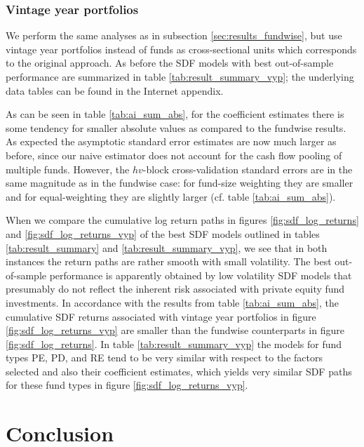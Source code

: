 \documentclass[12pt]{article}
\begin{document}
\subsubsection{Vintage year portfolios}

We perform the same analyses as in subsection \ref{sec:results_fundwise}, but use vintage year portfolios instead of funds as cross-sectional units which corresponds to the original \cite{DLP12} approach.
As before the SDF models with best out-of-sample performance are summarized in table \ref{tab:result_summary_vyp}; the underlying data tables can be found in the Internet appendix. 

As can be seen in table \ref{tab:ai_sum_abs}, for the coefficient estimates there is some tendency for smaller absolute values as compared to the fundwise results.
As expected the asymptotic standard error estimates are now much larger as before, since our naive estimator does not account for the cash flow pooling of multiple funds.
However, the $hv$-block cross-validation standard errors are in the same magnitude as in the fundwise case: for fund-size weighting they are smaller and for equal-weighting they are slightly larger (cf. table \ref{tab:ai_sum_abs}).

When we compare the cumulative log return paths in figures \ref{fig:sdf_log_returns} and \ref{fig:sdf_log_returns_vyp} of the best SDF models outlined in tables \ref{tab:result_summary} and \ref{tab:result_summary_vyp}, we see that in both instances the return paths are rather smooth with small volatility.
The best out-of-sample performance is apparently obtained by low volatility SDF models that presumably do not reflect the inherent risk associated with private equity fund investments.
In accordance with the results from table \ref{tab:ai_sum_abs}, the cumulative SDF returns associated with vintage year portfolios in figure \ref{fig:sdf_log_returns_vyp} are smaller than the fundwise counterparts in figure \ref{fig:sdf_log_returns}.
In table \ref{tab:result_summary_vyp} the models for fund types PE, PD, and RE tend to be very similar with respect to the factors selected and also their coefficient estimates, which yields very similar SDF paths for these fund types in figure \ref{fig:sdf_log_returns_vyp}.




\section{Conclusion}
\label{sec:conclusion}
\end{document}
